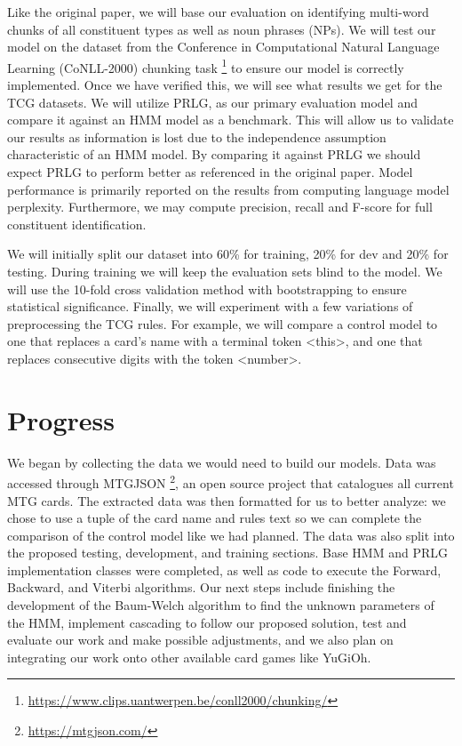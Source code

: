 \documentclass[11pt,a4paper]{article}
\begin{document}
Like the original paper, we will base our evaluation on identifying multi-word chunks of all constituent types as well as noun phrases (NPs).
We will test our model on the dataset from the Conference in Computational Natural Language Learning (CoNLL-2000) chunking task \footnote{\url{https://www.clips.uantwerpen.be/conll2000/chunking/}} to ensure our model is correctly implemented.
Once we have verified this, we will see what results we get for the TCG datasets.
We will utilize PRLG, as our primary evaluation model and compare it against an HMM model as a benchmark.
This will allow us to validate our results as information is lost due to the independence assumption characteristic of an HMM model.
By comparing it against PRLG we should expect PRLG to perform better as referenced in the original paper.
Model performance is primarily reported on the results from computing language model perplexity.
Furthermore, we may compute precision, recall and F-score for full constituent identification.

We will initially split our dataset into 60\% for training, 20\% for dev and 20\% for testing.
During training we will keep the evaluation sets blind to the model.
We will use the 10-fold cross validation method with bootstrapping to ensure statistical significance.
Finally, we will experiment with a few variations of preprocessing the TCG rules.
For example, we will compare a control model to one that replaces a card’s name with a terminal token \textless this\textgreater, and one that replaces consecutive digits with the token \textless number\textgreater.

\section{Progress}

We began by collecting the data we would need to build our models.
Data was accessed through MTGJSON \footnote{\url{https://mtgjson.com/}}, an open source project that catalogues all current MTG cards.
The extracted data was then formatted for us to better analyze: we chose to use a tuple of the card name and rules text so we can complete the comparison of the control model like we had planned.
The data was also split into the proposed testing, development, and training sections.
Base HMM and PRLG implementation classes were completed, as well as code to execute the Forward, Backward, and Viterbi algorithms.
Our next steps include finishing the development of the Baum-Welch algorithm to find the unknown parameters of the HMM, implement cascading to follow our proposed solution, test and evaluate our work and make possible adjustments, and we also plan on integrating our work onto other available card games like YuGiOh. 
\end{document}
